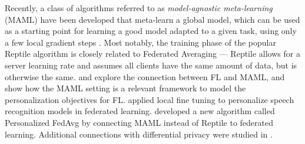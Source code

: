 \documentclass[11pt]{article}
\begin{document}
Recently, a class of algorithms referred to as \emph{model-agnostic meta-learning} (MAML) have been developed that meta-learn a global model, which can be used as a starting point for learning a good model adapted to a given task, using only a few local gradient steps \citep{finn17maml}. Most notably, the training phase of the popular Reptile algorithm \citep{nichol18reptile} is closely related to Federated Averaging \citep{mcmahan17fedavg} --- Reptile allows for a server learning rate and assumes all clients have the same amount of data, but is otherwise the same. \citet{khodak19adaptive} and \citet{jiang2019improving} explore the connection between FL and MAML, and show how the MAML setting is a relevant framework to model the personalization objectives for FL. \citet{chai2019personalization} applied local fine tuning to personalize speech recognition models in federated learning. \citet{fallah2020personalized} developed a new algorithm called Personalized FedAvg by connecting MAML instead of Reptile to federated learning. Additional connections with differential privacy were studied in \citep{li19dpmeta}.
\end{document}
